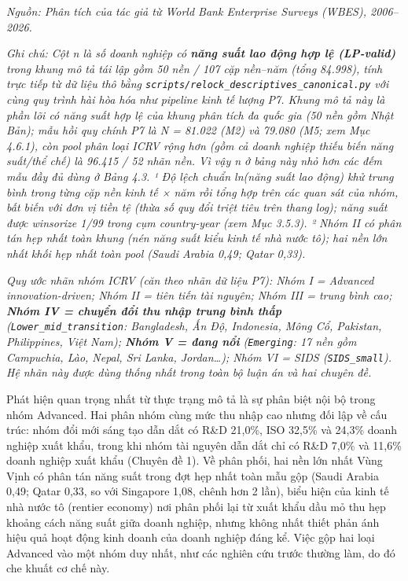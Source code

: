 \documentclass[
  a4paper,
  13pt]{extreport}
\begin{document}
\emph{Nguồn: Phân tích của tác giả từ World Bank Enterprise Surveys
(WBES), 2006--2026.}

\emph{Ghi chú: Cột n là số doanh nghiệp có \textbf{năng suất lao động
hợp lệ (LP-valid)} trong khung mô tả tái lập gồm 50 nền / 107 cặp
nền--năm (tổng 84.998), tính trực tiếp từ dữ liệu thô bằng
\texttt{scripts/relock\_descriptives\_canonical.py} với cùng quy trình
hài hòa hóa như pipeline kinh tế lượng P7. Khung mô tả này là phần lõi
có năng suất hợp lệ của khung phân tích đa quốc gia (50 nền gồm Nhật
Bản); mẫu hồi quy chính P7 là N = 81.022 (M2) và 79.080 (M5; xem Mục
4.6.1), còn pool phân loại ICRV rộng hơn (gồm cả doanh nghiệp thiếu biến
năng suất/thể chế) là 96.415 / 52 nhãn nền. Vì vậy n ở bảng này nhỏ hơn
các đếm mẫu đầy đủ dùng ở Bảng 4.3. ¹ Độ lệch chuẩn ln(năng suất lao
động) khử trung bình trong từng cặp nền kinh tế × năm rồi tổng hợp trên
các quan sát của nhóm, bất biến với đơn vị tiền tệ (thừa số quy đổi
triệt tiêu trên thang log); năng suất được winsorize 1/99 trong cụm
country-year (xem Mục 3.5.3). ² Nhóm II có phân tán hẹp nhất toàn khung
(nén năng suất kiểu kinh tế nhà nước tô); hai nền lớn nhất khối hẹp nhất
toàn pool (Saudi Arabia 0,49; Qatar 0,33).}

\emph{Quy ước nhãn nhóm ICRV (căn theo nhãn dữ liệu P7): Nhóm I =
Advanced innovation-driven; Nhóm II = tiên tiến tài nguyên; Nhóm III =
trung bình cao; \textbf{Nhóm IV = chuyển đổi thu nhập trung bình thấp}
(\texttt{Lower\_mid\_transition}: Bangladesh, Ấn Độ, Indonesia, Mông Cổ,
Pakistan, Philippines, Việt Nam); \textbf{Nhóm V = đang nổi}
(\texttt{Emerging}: 17 nền gồm Campuchia, Lào, Nepal, Sri Lanka,
Jordan\ldots); Nhóm VI = SIDS (\texttt{SIDS\_small}). Hệ nhãn này được
dùng thống nhất trong toàn bộ luận án và hai chuyên đề.}

Phát hiện quan trọng nhất từ thực trạng mô tả là sự phân biệt nội bộ
trong nhóm Advanced. Hai phân nhóm cùng mức thu nhập cao nhưng đối lập
về cấu trúc: nhóm đổi mới sáng tạo dẫn dắt có R\&D 21,0\%, ISO 32,5\% và
24,3\% doanh nghiệp xuất khẩu, trong khi nhóm tài nguyên dẫn dắt chỉ có
R\&D 7,0\% và 11,6\% doanh nghiệp xuất khẩu (Chuyên đề 1). Về phân phối,
hai nền lớn nhất Vùng Vịnh có phân tán năng suất trong đợt hẹp nhất toàn
mẫu gộp (Saudi Arabia 0,49; Qatar 0,33, so với Singapore 1,08, chênh hơn
2 lần), biểu hiện của kinh tế nhà nước tô (rentier economy) nơi phân
phối lại từ xuất khẩu dầu mỏ thu hẹp khoảng cách năng suất giữa doanh
nghiệp, nhưng không nhất thiết phản ánh hiệu quả hoạt động kinh doanh
của doanh nghiệp đáng kể. Việc gộp hai loại Advanced vào một nhóm duy
nhất, như các nghiên cứu trước thường làm, do đó che khuất cơ chế này.
\end{document}
